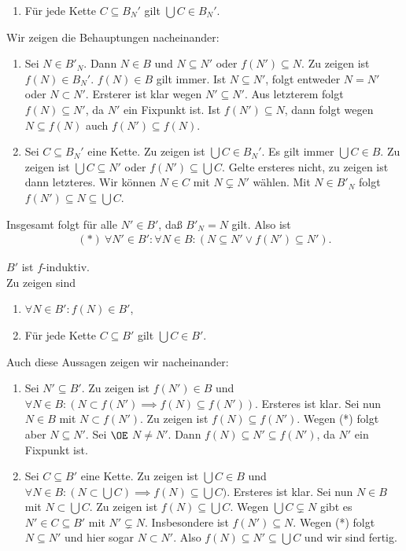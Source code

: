 \documentclass[../../main.tex]{subfiles}
\begin{document}
\begin{cproof}
\begin{behbox}
\begin{enumerate}[\normalfont(b)]
				\item Für jede Kette $C\subseteq B_N'$ gilt $\bigcup C\in B_N'$.
			\end{enumerate}
			Wir zeigen die Behauptungen nacheinander:
			\begin{enumerate}[\normalfont(b)]
				\item Sei $N\in B'_N$. Dann $N\in B$ und $N\subseteq N'$ oder $f(N')\subseteq N$. Zu zeigen ist $f(N)\in B_N'$. $f(N)\in B$ gilt immer. Ist $N\subseteq N'$, folgt entweder $N=N'$ oder $N\subset N'$. Ersterer ist klar wegen $N'\subseteq N'$. Aus letzterem folgt $f(N)\subseteq N'$, da $N'$ ein Fixpunkt ist. Ist $f(N')\subseteq N$, dann folgt wegen $N\subseteq f(N)$ auch $f(N')\subseteq f(N)$.
				\item Sei $C\subseteq B_N'$ eine Kette. Zu zeigen ist $\bigcup C\in B_N'$. Es gilt immer $\bigcup C\in B$. Zu zeigen ist $\bigcup C\subseteq N'$ oder $f(N')\subseteq \bigcup C$. Gelte ersteres nicht, zu zeigen ist dann letzteres. Wir können $N\in C$ mit $N\subsetneq N'$ wählen. Mit $N\in B'_N$ folgt $f(N')\subseteq N\subseteq \bigcup C$.
			\end{enumerate}
	\end{behbox}
	Insgesamt folgt für alle $N'\in B'$, daß $B'_N=N$ gilt. Also ist
	\begin{align*}
		(*)\ \forall N'\in B': \forall N\in B: (N\subseteq N'\lor f(N')\subseteq N').
	\end{align*}
	\begin{behbox}
		\hbeh{}
			$B'$ ist $f$-induktiv. \\
		\hbeg{}
			Zu zeigen sind 
			\begin{enumerate}[\normalfont(a)]
				\item $\forall N\in B': f(N)\in B'$,
				\item Für jede Kette $C\subseteq B'$ gilt $\bigcup C\in B'$.
			\end{enumerate}
			Auch diese Aussagen zeigen wir nacheinander:
			\begin{enumerate}[\normalfont(a)]
				\item Sei $N'\subseteq B'$. Zu zeigen ist $f(N')\in B$ und $\forall N\in B: (N\subset f(N')\implies f(N)\subseteq f(N'))$. Ersteres ist klar. Sei nun $N\in B$ mit $N\subset f(N')$. Zu zeigen ist $f(N)\subseteq f(N')$. Wegen (*) folgt aber $N\subseteq N'$. Sei $\OE$ $N\neq N'$. Dann $f(N)\subseteq N'\subseteq f(N')$, da $N'$ ein Fixpunkt ist.
				\item Sei $C\subseteq B'$ eine Kette. Zu zeigen ist $\bigcup C\in B$ und $\forall N\in B: (N\subset \bigcup C)\implies f(N)\subseteq \bigcup C)$. Ersteres ist klar. Sei nun $N\in B$ mit $N\subset \bigcup C$. Zu zeigen ist $f(N)\subseteq \bigcup C$. Wegen $\bigcup C\subsetneq N$ gibt es $N'\in C\subseteq B'$ mit $N'\subsetneq N$. Insbesondere ist $f(N')\subseteq N$. Wegen (*) folgt $N\subseteq N'$ und hier sogar $N\subset N'$. Also $f(N)\subseteq N'\subseteq \bigcup C$ und wir sind fertig.

\end{enumerate}
\end{behbox}
\end{cproof}
\end{document}
